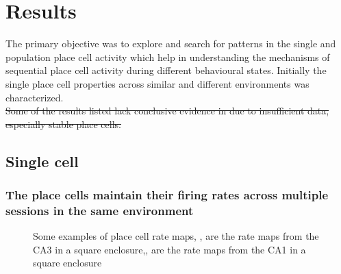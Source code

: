 \chapter{Results}
\label{results}

The primary objective was to explore and search for patterns in the single and population place cell activity which help in understanding the mechanisms of sequential place cell activity during different behavioural states. Initially the single place cell properties across similar and different environments was characterized.  \\
\st{Some of the results listed lack conclusive evidence in due to insufficient data, especially stable place cells. }

\section{Single cell}
\subsection[Place cell firing in same environment]{The place cells maintain their firing rates across multiple sessions in the same environment}


\begin{figure}[htb!]
\centering
{}
\label{fig:ratemaps}
\caption[Rate maps]{Some examples of place cell rate maps, ,  are the rate maps from the CA3 in a square enclosure,,  are the rate maps from the CA1 in a square enclosure}
\end{figure}


